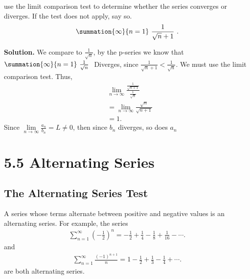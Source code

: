 \documentclass{report}
\begin{document}
   \pagebreak \bigbreak \noindent  
   \begin{eg}
      use the limit comparison test to determine whether the series converges or diverges. If the test does not apply, say so. 
      \begin{align*}
          \summation{\infty}{n=1}\ \frac{1}{\sqrt{n} + 1}\ 
      .\end{align*}
   \end{eg}
   \bigbreak \noindent 
   \textbf{Solution.} We compare to $\frac{1}{\sqrt{n}}$, by the p-series  we know that $\summation{\infty}{n=1}\ \frac{1}{\sqrt{n}}\  $ Diverges, since $\frac{1}{\sqrt{n} + 1} < \frac{1}{\sqrt{n}}$. We must use the limit comparison test. Thus, 
   \begin{align*}
       &\lim\limits_{n \to \infty}{\frac{\frac{1}{\sqrt{n+1}}}{\frac{1}{\sqrt{n}}}} \\
       &=\lim\limits_{n \to \infty}{\frac{\sqrt{n}}{\sqrt{n+1}}} \\
       &= 1
   .\end{align*}
   \bigbreak \noindent 
   Since $\lim\limits_{n \to \infty}{\frac{a_{n}}{b_{n}}} = L \ne 0$, then since $b_{n} $ diverges, so does $a_{n} $

   \pagebreak 
   \section*{5.5 Alternating Series}

   \bigbreak \noindent 
   \subsection*{The Alternating Series Test}
   \bigbreak \noindent 
   A series whose terms alternate between positive and negative values is an alternating series. For example, the series
   \begin{align*}
        \sum_{n=1}^{\infty} \left(-\frac{1}{2}\right)^n = -\frac{1}{2} + \frac{1}{4} - \frac{1}{8} + \frac{1}{16} - \cdots
   .\end{align*}
   \bigbreak \noindent 
   and
   \begin{align*}
       \sum_{n=1}^{\infty} \frac{(-1)^{n+1}}{n}  = 1 - \frac{1}{2} + \frac{1}{3} - \frac{1}{4} + \cdots
   .\end{align*}
   are both alternating series.
\end{document}
